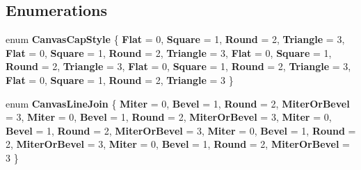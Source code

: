 \subsection*{Enumerations}
\begin{DoxyCompactItemize}
\item 
\mbox{\label{namespace_microsoft_1_1_graphics_1_1_canvas_1_1_geometry_aceede6fdba7f9ce2af9afb615db0aebf}} 
enum {\bfseries Canvas\+Cap\+Style} \{ \newline
{\bfseries Flat} = 0, 
{\bfseries Square} = 1, 
{\bfseries Round} = 2, 
{\bfseries Triangle} = 3, 
\newline
{\bfseries Flat} = 0, 
{\bfseries Square} = 1, 
{\bfseries Round} = 2, 
{\bfseries Triangle} = 3, 
\newline
{\bfseries Flat} = 0, 
{\bfseries Square} = 1, 
{\bfseries Round} = 2, 
{\bfseries Triangle} = 3, 
\newline
{\bfseries Flat} = 0, 
{\bfseries Square} = 1, 
{\bfseries Round} = 2, 
{\bfseries Triangle} = 3, 
\newline
{\bfseries Flat} = 0, 
{\bfseries Square} = 1, 
{\bfseries Round} = 2, 
{\bfseries Triangle} = 3
 \}
\item 
\mbox{\label{namespace_microsoft_1_1_graphics_1_1_canvas_1_1_geometry_a962f9c8c901a160f4a74f2be716840d7}} 
enum {\bfseries Canvas\+Line\+Join} \{ \newline
{\bfseries Miter} = 0, 
{\bfseries Bevel} = 1, 
{\bfseries Round} = 2, 
{\bfseries Miter\+Or\+Bevel} = 3, 
\newline
{\bfseries Miter} = 0, 
{\bfseries Bevel} = 1, 
{\bfseries Round} = 2, 
{\bfseries Miter\+Or\+Bevel} = 3, 
\newline
{\bfseries Miter} = 0, 
{\bfseries Bevel} = 1, 
{\bfseries Round} = 2, 
{\bfseries Miter\+Or\+Bevel} = 3, 
\newline
{\bfseries Miter} = 0, 
{\bfseries Bevel} = 1, 
{\bfseries Round} = 2, 
{\bfseries Miter\+Or\+Bevel} = 3, 
\newline
{\bfseries Miter} = 0, 
{\bfseries Bevel} = 1, 
{\bfseries Round} = 2, 
{\bfseries Miter\+Or\+Bevel} = 3
 \}
\item 
\mbox{\label{namespace_microsoft_1_1_graphics_1_1_canvas_1_1_geometry_ab285a1e0da5c91c32bbb2fbbec7ad1c0}} 

\end{DoxyCompactItemize}
